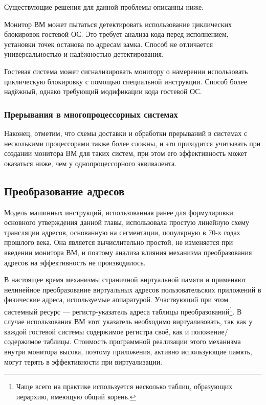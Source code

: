 Существующие решения для данной проблемы описанны ниже.

\begin{enumerate*}
    \item Монитор ВМ может пытаться детектировать использование циклических блокировок гостевой ОС. Это требует анализа кода перед исполнением, установки точек останова по адресам замка. Способ не отличается универсальностью и надёжностью детектирования.
    \item Гостевая система может сигнализировать монитору о намерении использовать циклическую блокировку с помощью специальной инструкции. Способ более надёжный, однако требующий модификации кода гостевой ОС.
\end{enumerate*}

\subsubsection{Прерывания в многопроцессорных системах}

Наконец, отметим, что схемы доставки и обработки прерываний в системах с несколькими процессорами также более сложны, и это приходится учитывать при создании монитора ВМ для таких систем, при этом его эффективность может оказаться ниже, чем у однопроцессорного эквивалента. 

\subsection{Преобразование адресов}

Модель машинных инструкций, использованная ранее для формулировки основного утверждения данной главы, использовала простую линейную схему трансляции адресов, основанную на сегментации, популярную в 70-х годах прошлого века. Она является вычислительно простой, не изменяется при введении монитора ВМ, и поэтому анализа влияния механизма преобразования адресов на эффективность не производилось.

В настоящее время механизмы страничной виртуальной памяти и применяют нелинейное преобразование виртуальных адресов пользовательских приложений в физические адреса, используемые аппаратурой. Участвующий при этом системный ресурс --- регистр-указатель адреса таблицы преобразований\footnote{Чаще всего на практике используется несколько таблиц, образующих иерархию, имеющую общий корень.}. В случае использования ВМ этот указатель необходимо виртуализовать, так как у каждой гостевой системы содержимое регистра своё, как и положение/содержимое таблицы. Стоимость программной реализации этого механизма внутри монитора высока, поэтому приложения, активно использующие память, могут терять в эффективности при виртуализации.

